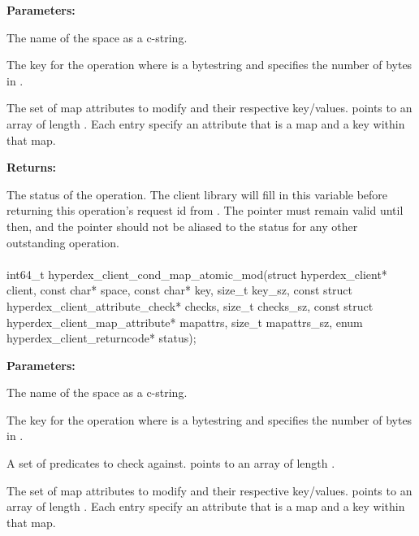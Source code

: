 \noindent\textbf{Parameters:}
\begin{description}[labelindent=\widthof{{\code{mapattrs}, \code{mapattrs\_sz}}},leftmargin=*,noitemsep,nolistsep,align=right]
\item[\code{space}] The name of the space as a c-string.
\item[\code{key}, \code{key\_sz}] The key for the operation where  is a bytestring and  specifies the number of bytes in .
\item[\code{mapattrs}, \code{mapattrs\_sz}] The set of map attributes to modify and their respective key/values.   points to an array of length .  Each entry specify an attribute that is a map and a key within that map.
\end{description}

\noindent\textbf{Returns:}
\begin{description}[labelindent=\widthof{{\code{status}}},leftmargin=*,noitemsep,nolistsep,align=right]
\item[\code{status}] The status of the operation.  The client library will fill in this variable before returning this operation's request id from .  The pointer must remain valid until then, and the pointer should not be aliased to the status for any other outstanding operation.
\end{description}

\paragraph{}
\label{api:c:cond_map_atomic_mod}
\begin{ccode}
int64_t hyperdex_client_cond_map_atomic_mod(struct hyperdex_client* client,
        const char* space,
        const char* key, size_t key_sz,
        const struct hyperdex_client_attribute_check* checks, size_t checks_sz,
        const struct hyperdex_client_map_attribute* mapattrs, size_t mapattrs_sz,
        enum hyperdex_client_returncode* status);
\end{ccode}
\funcdesc 

\noindent\textbf{Parameters:}
\begin{description}[labelindent=\widthof{{\code{mapattrs}, \code{mapattrs\_sz}}},leftmargin=*,noitemsep,nolistsep,align=right]
\item[\code{space}] The name of the space as a c-string.
\item[\code{key}, \code{key\_sz}] The key for the operation where  is a bytestring and  specifies the number of bytes in .
\item[\code{checks}, \code{checks\_sz}] A set of predicates to check against.   points to an array of length .
\item[\code{mapattrs}, \code{mapattrs\_sz}] The set of map attributes to modify and their respective key/values.   points to an array of length .  Each entry specify an attribute that is a map and a key within that map.
\end{description}


